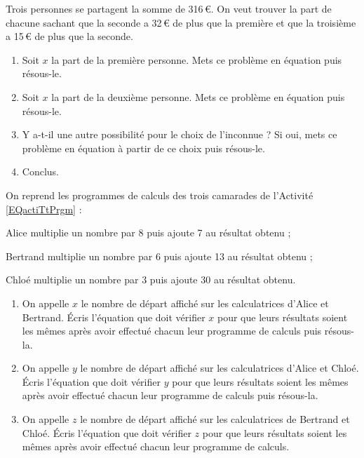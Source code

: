     


\begin{activite}
Trois personnes se partagent la somme de 316\,€. On veut trouver la part de chacune sachant que la seconde a 32\,€ de plus que la première et que la troisième a 15\,€ de plus que la seconde. 
\begin{enumerate}
\item Soit $x$ la part de la première personne. Mets ce problème en équation puis résous-le.
\item Soit $x$ la part de la deuxième personne. Mets ce problème en équation puis résous-le.
\item Y a-t-il une autre possibilité pour le choix de l'inconnue ? Si oui, mets ce problème en équation à partir de ce choix puis résous-le.
\item Conclus.
\end{enumerate}
\end{activite}





\begin{activite}
On reprend les programmes de calculs des trois camarades de l'Activité \ref{EQactiTtPrgm} :

\begin{cadre}
Alice multiplie un nombre par 8 puis ajoute 7 au résultat obtenu ;
\end{cadre}

\begin{cadre}
Bertrand multiplie un nombre par 6 puis ajoute 13 au résultat obtenu ;
\end{cadre}

\begin{cadre}
Chloé multiplie un nombre par 3 puis ajoute 30 au résultat obtenu.
\end{cadre}

\begin{enumerate}
\item On appelle $x$ le nombre de départ affiché sur les calculatrices d'Alice et Bertrand.
Écris l'équation que doit vérifier $x$ pour que leurs résultats soient les mêmes après avoir effectué chacun leur programme de calculs puis résous-la.
\item On appelle $y$ le nombre de départ affiché sur les calculatrices d'Alice et Chloé.
Écris l'équation que doit vérifier $y$ pour que leurs résultats soient les mêmes après avoir effectué chacun leur programme de calculs puis résous-la.
\item On appelle $z$ le nombre de départ affiché sur les calculatrices de Bertrand et Chloé.
Écris l'équation que doit vérifier $z$ pour que leurs résultats soient les mêmes après avoir effectué chacun leur programme de calculs.
\end{enumerate}
\end{activite}




